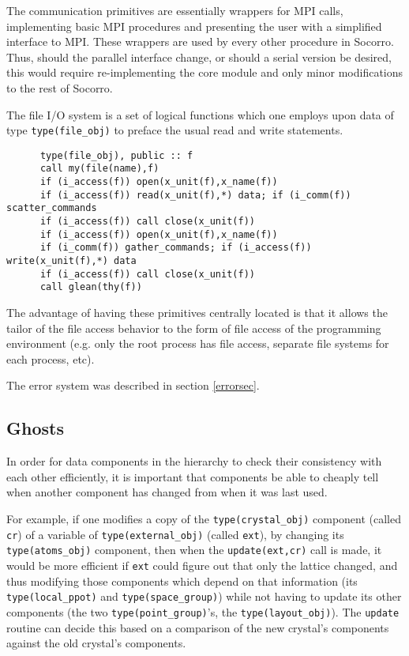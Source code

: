 The communication primitives are essentially wrappers for MPI calls,
implementing basic MPI procedures and presenting the user with a
simplified interface to MPI.  These wrappers are used by every other
procedure in Socorro.  Thus, should the parallel interface change, or
should a serial version be desired, this would require re-implementing
the core module and only minor modifications to the rest of Socorro.

The file I/O system is a set of logical functions which one employs
upon data of type \verb+type(file_obj)+ to preface the usual read and
write statements.

\begin{verbatim}
      type(file_obj), public :: f
      call my(file(name),f)
      if (i_access(f)) open(x_unit(f),x_name(f))
      if (i_access(f)) read(x_unit(f),*) data; if (i_comm(f)) scatter_commands
      if (i_access(f)) call close(x_unit(f))
      if (i_access(f)) open(x_unit(f),x_name(f))
      if (i_comm(f)) gather_commands; if (i_access(f)) write(x_unit(f),*) data
      if (i_access(f)) call close(x_unit(f))
      call glean(thy(f))
\end{verbatim}     

The advantage of having these primitives centrally located is that it
allows the tailor of the file access behavior to the form of file
access of the programming environment (e.g. only the root process has
file access, separate file systems for each process, etc).

The error system was described in section \ref{errorsec}.

\subsection{Ghosts}

\label{ghostsec}

In order for data components in the hierarchy to check their
consistency with each other efficiently, it is important that
components be able to cheaply tell when another component has changed
from when it was last used.

For example, if one modifies a copy of the \verb+type(crystal_obj)+
component (called \verb+cr+) of a variable of
\verb+type(external_obj)+ (called \verb+ext+), by changing 
its \verb+type(atoms_obj)+ component, then when the
\verb+update(ext,cr)+ call is made, it would be more efficient if
\verb+ext+ could figure out that only the lattice changed, and thus
modifying those components which depend on that information (its
\verb+type(local_ppot)+ and \verb+type(space_group)+) while not having to 
update its other components (the two \verb+type(point_group)+'s, the
\verb+type(layout_obj)+).  The \verb+update+ routine can decide this
based on a comparison of the new crystal's components 
against the old crystal's components.


